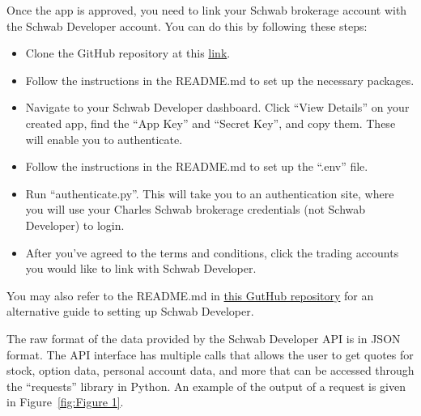 \documentclass{article}
\begin{document}
\indent Once the app is approved, you need to link your Schwab brokerage account with the Schwab Developer account. You can do this by following these steps: 
\begin{itemize}
    \item Clone the GitHub repository at this \href{https://github.com/mikemartinez13/option-profit-calculator}{link}.
    \item Follow the instructions in the README.md to set up the necessary packages. 
    \item Navigate to your Schwab Developer dashboard. Click \enquote{View Details} on your created app, find the \enquote{App Key} and \enquote{Secret Key}, and copy them. These will enable you to authenticate. 
    \item Follow the instructions in the README.md to set up the \enquote{.env} file. 
    \item Run ``authenticate.py''. This will take you to an authentication site, where you will use your Charles Schwab brokerage credentials (not Schwab Developer) to login. 
    \item After you've agreed to the terms and conditions, click the trading accounts you would like to link with Schwab Developer.

\end{itemize}

You may also refer to the README.md in \href{https://github.com/tylerebowers/Schwab-API-Python}{this GutHub repository} for an alternative guide to setting up Schwab Developer. 

\indent The raw format of the data provided by the Schwab Developer API is in JSON format. The API interface has multiple calls that allows the user to get quotes for stock, option data, personal account data, and more that can be accessed through the \enquote{requests} library in Python. An example of the output of a request is given in Figure~\ref{fig:Figure 1}.
\end{document}
